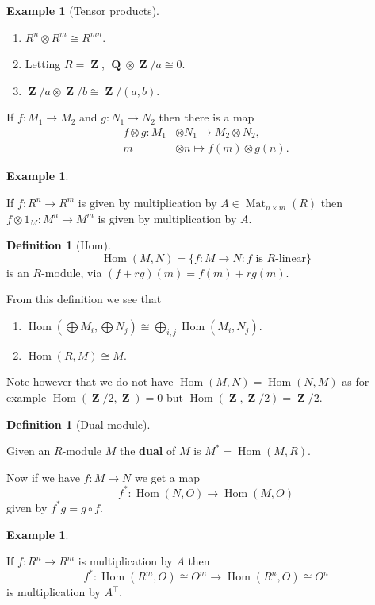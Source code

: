 \documentclass[10pt,]{book}
\newcommand{\terminology}[1]{\textbf{#1}}
\theoremstyle{plain}
\theoremstyle{definition}
\newtheorem{definition}[theorem]{Definition}
\newtheorem{example}[theorem]{Example}
\numberwithin{equation}{section}
\DeclareMathOperator{\Hom}{Hom}
\DeclareMathOperator{\QQ}{\mathbf{Q}}
\DeclareMathOperator{\ZZ}{\mathbf{Z}}
\begin{document}
\begin{example}[Tensor products]\label{example-21}
\begin{enumerate}
\item{}\(R^n \otimes R^m \cong R^{mn}\).\item{}Letting \(R = \ZZ\), \( \QQ \otimes \ZZ/a\cong 0\).\item{}\(\ZZ/a\otimes\ZZ/b\cong \ZZ/(a,b)\).\end{enumerate}
\end{example}
\par
If \(f\colon M_1 \to M_2\) and \(g\colon N_1 \to N_2\) then there is a map
            \begin{align*}
f\otimes g \colon M_1 &\otimes N_1 \to M_2 \otimes N_2,\\
m&\otimes n \mapsto f(m) \otimes g(n).
\end{align*}
\begin{example}\label{example-22}

              If \( f\colon R^n \to R^m\) is given by multiplication by \(A\in \operatorname{Mat}_{n\times m}(R)\) then \(f\otimes 1_M\colon M^n \to M^m\) is given by multiplication by \(A\).
            \end{example}
\begin{definition}[Hom]\label{definition-22}
\[\Hom(M, N) = \{f\colon M\to N : f \text{ is } R \text{-linear}\}\]
              is an \(R\)-module, via \((f + rg)(m) = f(m) + rg(m)\).
            \end{definition}
\par
From this definition we see that
            \begin{enumerate}
\item{}\(\Hom(\bigoplus M_i, \bigoplus N_j)\cong \bigoplus_{i,j} \Hom(M_i, N_j)\).\item{}\(\Hom(R, M) \cong M\).\end{enumerate}

\par
Note however that we do not have \(\Hom(M,N) = \Hom(N,M)\) as for example \(\Hom(\ZZ/2,\ZZ) = 0\) but \(\Hom(\ZZ, \ZZ/2) = \ZZ/2\).%
\begin{definition}[Dual module]\label{definition-23}

              Given an \(R\)-module \(M\) the \terminology{dual} of \(M\) is \(M^* = \Hom(M,R)\).
            \end{definition}
\par
Now if we have \(f\colon M \to N\) we get a map
            \[f^*\colon \Hom(N, O) \to \Hom(M, O)\]
            given by \(f^*g = g\circ f\).
\begin{example}\label{example-23}

              If \(f\colon R^n \to R^m\) is multiplication by \(A\) then
              \[f^*\colon \Hom(R^m , O) \cong O^m \to \Hom(R^n, O) \cong O^n\]
              is multiplication by \(A^\top\).
            \end{example}
\typeout{************************************************}
\typeout{************************************************}
\end{document}
